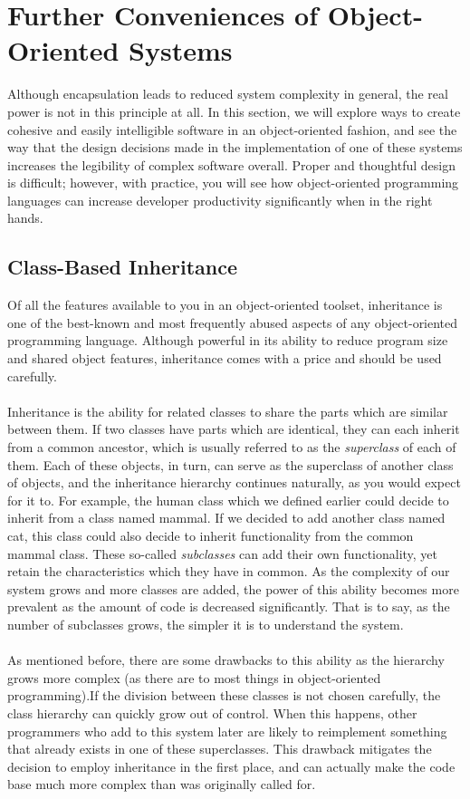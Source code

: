 \documentclass{article}
\begin{document}
\section{Further Conveniences of Object-Oriented Systems}
Although encapsulation leads to reduced system complexity in general, the real
power is not in this principle at all. In this section, we will explore ways to
create cohesive and easily intelligible software in an object-oriented fashion,
and see the way that the design decisions made in the implementation of one of
these systems increases the legibility of complex software overall. Proper and
thoughtful design is difficult; however, with practice, you will see how
object-oriented programming languages can increase developer productivity
significantly when in the right hands.
\subsection{Class-Based Inheritance}
Of all the features available to you in an object-oriented toolset, inheritance
is one of the best-known and most frequently abused aspects of any
object-oriented programming language. Although powerful in its ability to reduce
program size and shared object features, inheritance comes with a price and
should be used carefully.
\paragraph{}
Inheritance is the ability for related classes to share the parts which are
similar between them. If two classes have parts which are identical, they can
each inherit from a common ancestor, which is usually referred to as the
\textit{superclass} of each of them. Each of these objects, in turn, can serve
as the
superclass of another class of objects, and the inheritance hierarchy continues
naturally, as you would expect for it to. For example, the human class which we
defined earlier could decide to inherit from a class named mammal. If we decided
to add another class named cat, this class could also decide to inherit
functionality from the common mammal class. These so-called \textit{subclasses}
can add
their own functionality, yet retain the characteristics which they have in
common. As the complexity of our system grows and more classes are added, the
power of this ability becomes more prevalent as the amount of code is decreased
significantly. That is to say, as the number of subclasses grows, the simpler
it is to understand the system.
\paragraph{}
As mentioned before, there are some drawbacks to this ability as the hierarchy
grows more complex (as there are to most things in object-oriented
programming).If the division between these classes is not chosen carefully, the
class
hierarchy can quickly grow out of control. When this happens, other programmers
who add to this system later are likely to reimplement something that already
exists in one of these superclasses. This drawback mitigates the decision to
employ inheritance in the first place, and can actually make the code base much
more complex than was originally called for.
\end{document}
